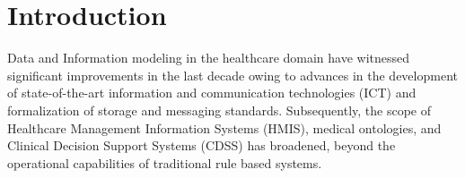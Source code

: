 
\section*{Introduction}
Data and Information modeling in the healthcare domain have witnessed significant improvements in the last decade owing to advances in the development of state-of-the-art information and communication technologies (ICT) and formalization of storage and messaging standards. Subsequently, the scope of Healthcare Management Information Systems (HMIS), medical ontologies, and Clinical Decision Support Systems (CDSS) has broadened, beyond the operational capabilities of traditional rule based systems.
